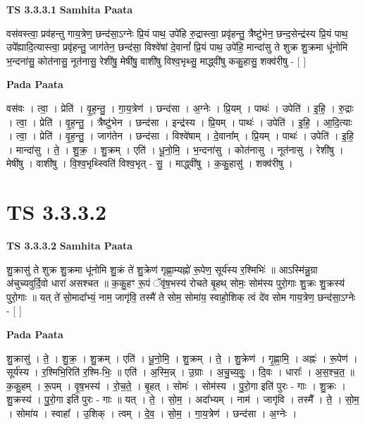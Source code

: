 \documentclass[17pt]{extarticle}
\begin{document}
\textbf{TS 3.3.3.1 } \newline
\textbf{Samhita Paata} \newline

वस॑वस्त्वा॒ प्रव॑हन्तु गाय॒त्रेण॒ छन्द॑सा॒ऽग्नेः प्रि॒यं पाथ॒ उपे॑हि रु॒द्रास्त्वा॒ प्रवृ॑हन्तु॒ त्रैष्टु॑भेन॒ छन्द॒सेन्द्र॑स्य प्रि॒यं पाथ॒ उपे᳚ह्यादि॒त्यास्त्वा॒ प्रवृ॑हन्तु॒ जाग॑तेन॒ छन्द॑सा॒ विश्वे॑षां दे॒वानां᳚ प्रि॒यं पाथ॒ उपे॑हि॒ मान्दा॑सु ते शुक्र शु॒क्रमा धू॑नोमि भ॒न्दना॑सु॒ कोत॑नासु॒ नूत॑नासु॒ रेशी॑षु॒ मेषी॑षु॒ वाशी॑षु विश्व॒भृथ्सु॒ माद्ध्वी॑षु ककु॒हासु॒ शक्व॑रीषु - [  ] \newline

\textbf{Pada Paata} \newline

वस॑वः । त्वा॒ । प्रेति॑ । वृ॒ह॒न्तु॒ । गा॒य॒त्रेण॑ । छन्द॑सा । अ॒ग्नेः । प्रि॒यम् । पाथः॑ । उपेति॑ । इ॒हि॒ । रु॒द्राः । त्वा॒ । प्रेति॑ । वृ॒ह॒न्तु॒ । त्रैष्टु॑भेन । छन्द॑सा । इन्द्र॑स्य । प्रि॒यम् । पाथः॑ । उपेति॑ । इ॒हि॒ । आ॒दि॒त्याः । त्वा॒ । प्रेति॑ । वृ॒ह॒न्तु॒ । जाग॑तेन । छन्द॑सा । विश्वे॑षाम् । दे॒वाना᳚म् । प्रि॒यम् । पाथः॑ । उपेति॑ । इ॒हि॒ । मान्दा॑सु । ते॒ । शु॒क्र॒ । शु॒क्रम् । एति॑ । धू॒नो॒मि॒ । भ॒न्दना॑सु । कोत॑नासु । नूत॑नासु । रेशी॑षु । मेषी॑षु । वाशी॑षु । वि॒श्व॒भृथ्स्विति॑ विश्व॒भृत् - सु॒ । माद्ध्वी॑षु । क॒कु॒हासु॑ । शक्व॑रीषु ।  \newline





\section{ TS 3.3.3.2 }

\textbf{TS 3.3.3.2 } \newline
\textbf{Samhita Paata} \newline

शु॒क्रासु॑ ते शुक्र शु॒क्रमा धू॑नोमि शु॒क्रं ते॑ शु॒क्रेण॑ गृह्णा॒म्यह्नो॑ रू॒पेण॒ सूर्य॑स्य र॒श्मिभिः॑ ॥ आऽस्मि॑न्नु॒ग्रा अ॑चुच्यवुर्दि॒वो धारा॑ असश्चत ॥ क॒कु॒हꣳ रू॒पं ॅवृ॑ष॒भस्य॑ रोचते बृ॒हथ् सोमः॒ सोम॑स्य पुरो॒गाः शु॒क्रः शु॒क्रस्य॑ पुरो॒गाः ॥ यत् ते॑ सो॒मादा᳚भ्यं॒ नाम॒ जागृ॑वि॒ तस्मै॑ ते सोम॒ सोमा॑य॒ स्वाहो॒शिक् त्वं दे॑व सोम गाय॒त्रेण॒ छन्द॑सा॒ऽग्नेः - [  ] \newline

\textbf{Pada Paata} \newline

शु॒क्रासु॑ । ते॒ । शु॒क्र॒ । शु॒क्रम् । एति॑ । धू॒नो॒मि॒ । शु॒क्रम् । ते॒ । शु॒क्रेण॑ । गृ॒ह्णा॒मि॒ । अह्नः॑ । रू॒पेण॑ । सूर्य॑स्य । र॒श्मिभि॒रिति॑ र॒श्मि-भिः॒ ॥ एति॑ । अ॒स्मि॒न्न् । उ॒ग्राः । अ॒चु॒च्य॒वुः॒ । दि॒वः । धाराः᳚ । अ॒स॒श्च॒त॒ ॥ क॒कु॒हम् । रू॒पम् । वृ॒ष॒भस्य॑ । रो॒च॒ते॒ । बृ॒हत् । सोमः॑ । सोम॑स्य । पु॒रो॒गा इति॑ पुरः - गाः । शु॒क्रः । शु॒क्रस्य॑ । पु॒रो॒गा इति॑ पुरः - गाः ॥ यत् । ते॒ । सो॒म॒ । अदा᳚भ्यम् । नाम॑ । जागृ॑वि । तस्मै᳚ । ते॒ । सो॒म॒ । सोमा॑य । स्वाहा᳚ । उ॒शिक् । त्वम् । दे॒व॒ । सो॒म॒ । गा॒य॒त्रेण॑ । छन्द॑सा । अ॒ग्नेः ।  \newline
\end{document}
